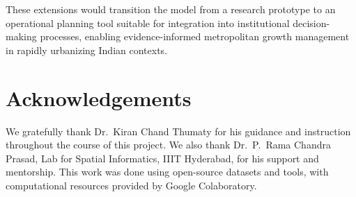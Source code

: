 \documentclass[12pt,a4paper]{article}
\begin{document}
These extensions would transition the model from a research prototype to an operational planning tool suitable for integration into institutional decision-making processes, enabling evidence-informed metropolitan growth management in rapidly urbanizing Indian contexts.



\section{Acknowledgements}

We gratefully thank Dr.\ Kiran Chand Thumaty for his guidance and instruction throughout the course of this project. We also thank Dr.\ P.\ Rama Chandra Prasad, Lab for Spatial Informatics, IIIT Hyderabad, for his support and mentorship. This work was done using open-source datasets and tools, with computational resources provided by Google Colaboratory.
\end{document}
